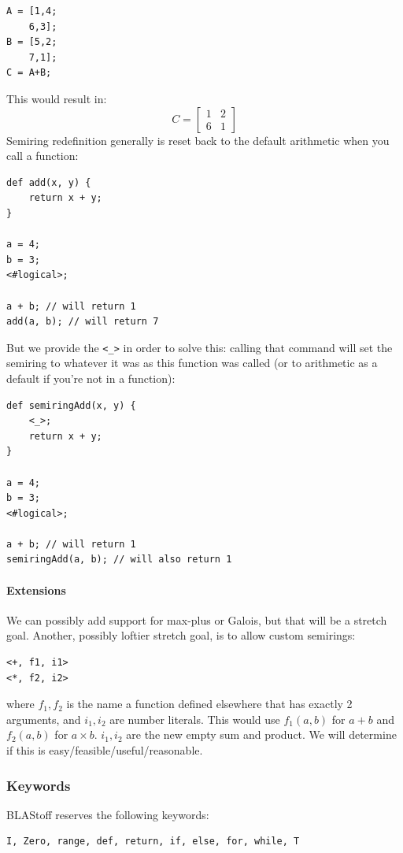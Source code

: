 \begin{lstlisting}
A = [1,4;
    6,3];
B = [5,2;
    7,1];
C = A+B;
\end{lstlisting}
This would result in:
$$C=\begin{bmatrix}
1&2\\
6&1
\end{bmatrix}$$
Semiring redefinition generally is reset back to the default arithmetic when you call a function:
\begin{lstlisting}
def add(x, y) {
    return x + y;
}

a = 4;
b = 3;
<#logical>;

a + b; // will return 1
add(a, b); // will return 7
\end{lstlisting}
But we provide the \verb=<_>= in order to solve this: calling that command will set the semiring to whatever it was as this function was called (or to arithmetic as a default if you're not in a function):
\begin{lstlisting}
def semiringAdd(x, y) {
    <_>;
    return x + y;
}

a = 4;
b = 3;
<#logical>;

a + b; // will return 1
semiringAdd(a, b); // will also return 1
\end{lstlisting}

\paragraph{Extensions}
We can possibly add support for max-plus or Galois, but that will be a stretch goal.  Another, possibly loftier stretch goal, is to allow custom semirings:
\begin{lstlisting}
<+, f1, i1>
<*, f2, i2>
\end{lstlisting}
where $f_1,f_2$ is the name a function defined elsewhere that has exactly 2 arguments, and $i_1, i_2$ are number literals.  This would use $f_1(a,b)$ for $a + b$ and $f_2(a,b)$ for $a \times b$.  $i_1, i_2$ are the new empty sum and product.  We will determine if this is easy/feasible/useful/reasonable.


\subsubsection{Keywords}
BLAStoff reserves the following keywords:
\begin{verbatim}
I, Zero, range, def, return, if, else, for, while, T
\end{verbatim}

